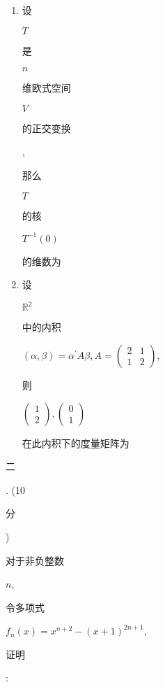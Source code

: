 \documentclass[10pt]{article}
\begin{document}
\begin{enumerate}
  \item \begin{CJK}{UTF8}{mj}设\end{CJK} $T$ \begin{CJK}{UTF8}{mj}是\end{CJK} $n$ \begin{CJK}{UTF8}{mj}维欧式空间\end{CJK} $V$ \begin{CJK}{UTF8}{mj}的正交变换\end{CJK}, \begin{CJK}{UTF8}{mj}那么\end{CJK} $T$ \begin{CJK}{UTF8}{mj}的核\end{CJK} $T^{-1}(0)$ \begin{CJK}{UTF8}{mj}的维数为\end{CJK}

  \item \begin{CJK}{UTF8}{mj}设\end{CJK} $\mathbb{R}^{2}$ \begin{CJK}{UTF8}{mj}中的内积\end{CJK} $(\alpha, \beta)=\alpha^{\prime} A \beta, A=\left(\begin{array}{ll}2 & 1 \\ 1 & 2\end{array}\right)$, \begin{CJK}{UTF8}{mj}则\end{CJK} $\left(\begin{array}{l}1 \\ 2\end{array}\right),\left(\begin{array}{l}0 \\ 1\end{array}\right)$ \begin{CJK}{UTF8}{mj}在此内积下的度量矩阵为\end{CJK}

\end{enumerate}
\begin{CJK}{UTF8}{mj}二\end{CJK}. (10 \begin{CJK}{UTF8}{mj}分\end{CJK}) \begin{CJK}{UTF8}{mj}对于非负整数\end{CJK} $n$, \begin{CJK}{UTF8}{mj}令多项式\end{CJK} $f_{n}(x)=x^{n+2}-(x+1)^{2 n+1}$, \begin{CJK}{UTF8}{mj}证明\end{CJK}:
\end{document}
